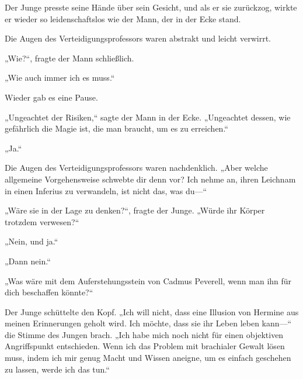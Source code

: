 Der Junge presste seine Hände über sein Gesicht, und als er sie zurückzog, wirkte er wieder so leidenschaftslos wie der Mann, der in der Ecke stand.

Die Augen des Verteidigungsprofessors waren abstrakt und leicht verwirrt.

„Wie?“, fragte der Mann schließlich.

„Wie auch immer ich es muss.“

Wieder gab es eine Pause.

„Ungeachtet der Risiken,“ sagte der Mann in der Ecke. „Ungeachtet dessen, wie gefährlich die Magie ist, die man braucht, um es zu erreichen.“

„Ja.“

Die Augen des Verteidigungsprofessors waren nachdenklich.
„Aber welche allgemeine Vorgehensweise schwebte dir denn vor? Ich nehme an, ihren Leichnam in einen Inferius zu verwandeln, ist nicht das, was du—“

„Wäre sie in der Lage zu denken?“, fragte der Junge. „Würde ihr Körper trotzdem verwesen?“

„Nein, und ja.“

„Dann nein.“

„Was wäre mit dem Auferstehungsstein von Cadmus Peverell, wenn man ihn für dich beschaffen könnte?“

Der Junge schüttelte den Kopf.
„Ich will nicht, dass eine Illusion von Hermine aus meinen Erinnerungen geholt wird. Ich möchte, dass sie ihr Leben leben kann—“ die Stimme des Jungen brach. „Ich habe mich noch nicht für einen objektiven Angriffspunkt entschieden. Wenn ich das Problem mit brachialer Gewalt lösen muss, indem ich mir genug Macht und Wissen aneigne, um es einfach geschehen zu lassen, werde ich das tun.“

